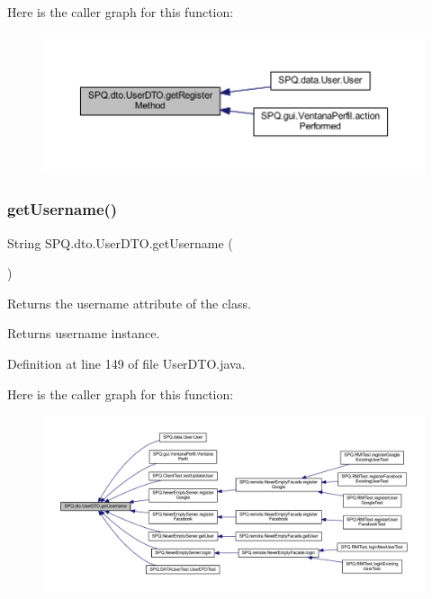 Here is the caller graph for this function\+:\nopagebreak
\begin{figure}[H]
\begin{center}
\leavevmode
\includegraphics[width=350pt]{class_s_p_q_1_1dto_1_1_user_d_t_o_ab2180112e27f967d77dd4696f88bd2ef_icgraph}
\end{center}
\end{figure}
\mbox{\label{class_s_p_q_1_1dto_1_1_user_d_t_o_a0cd335456c4f53b97069820475742980}} 
\subsubsection{\texorpdfstring{get\+Username()}{getUsername()}}
{\footnotesize\ttfamily String S\+P\+Q.\+dto.\+User\+D\+T\+O.\+get\+Username (\begin{DoxyParamCaption}{ }\end{DoxyParamCaption})}

Returns the username attribute of the class. \begin{DoxyReturn}{Returns}
username instance. 
\end{DoxyReturn}


Definition at line 149 of file User\+D\+T\+O.\+java.

Here is the caller graph for this function\+:\nopagebreak
\begin{figure}[H]
\begin{center}
\leavevmode
\includegraphics[width=350pt]{class_s_p_q_1_1dto_1_1_user_d_t_o_a0cd335456c4f53b97069820475742980_icgraph}
\end{center}
\end{figure}
\mbox{\label{class_s_p_q_1_1dto_1_1_user_d_t_o_a9ea48b87767eb765aac4f10d0cb9d53a}} 

